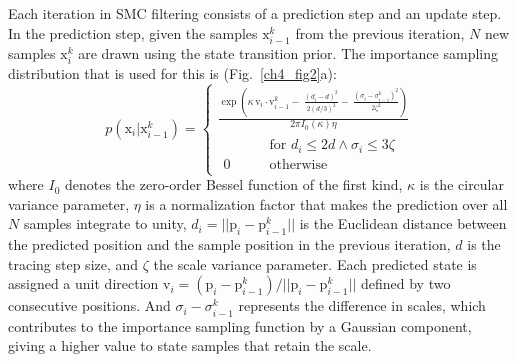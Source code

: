 Each iteration in SMC filtering consists of a prediction step and an update step. In the prediction step, given the samples $\mathrm{x}_{i-1}^k$ from the previous iteration, $N$ new samples $\mathrm{x}_i^k$ are drawn using the state transition prior. The importance sampling distribution that is used for this is (Fig.~\ref{ch4_fig2}a):
\begin{equation}
p(\mathrm{x}_i  | \mathrm{x}_{i-1}^k) =
\begin{cases}
\displaystyle\frac{\exp\left(\kappa\,\mathrm{v}_i \cdot \mathrm{v}_{i-1}^k -\ \frac{(d_i-d)^2}{2 (d/3)^2} -\ \frac{(\sigma_i-\sigma_{i-1}^k)^2}{2\zeta^2} \right)}{2 \pi I_0(\kappa)\eta} \\[2ex]
\begin{aligned}
& \qquad\text{for $d_i \leq 2d \land \sigma_i \leq 3\zeta$} \\
0 & \qquad\text{otherwise}
\end{aligned}
\end{cases}
\label{eq:pred}
\end{equation}
where $I_0$ denotes the zero-order Bessel function of the first kind, $\kappa$ is the circular variance parameter, $\eta$ is a normalization factor that makes the prediction over all $N$ samples integrate to unity, $d_i= || \mathrm{p}_i - \mathrm{p}_{i-1}^k ||$ is the Euclidean distance between the predicted position and the sample position in the previous iteration, $d$ is the tracing step size, and $\zeta$ the scale variance parameter. Each predicted state is assigned a unit direction $\mathrm{v}_i = (\mathrm{p}_i - \mathrm{p}_{i-1}^k) / || \mathrm{p}_i - \mathrm{p}_{i-1}^k ||$ defined by two consecutive positions. And $\sigma_i-\sigma_{i-1}^k$ represents the difference in scales, which contributes to the importance sampling function by a Gaussian component, giving a higher value to state samples that retain the scale.

